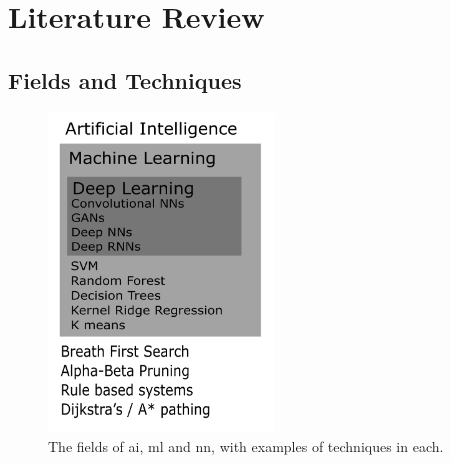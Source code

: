 \chapter{Literature Review}



\section*{Fields and Techniques}

\begin{figure}
    \includegraphics[width=60mm]{figs/ai_ml_dl.png}
    \caption{The fields of \gls{ai}, \gls{ml} and \gls{nn}, with examples of techniques in each.}
    \label{fig:ai_ml_dl} 
\end{figure}


